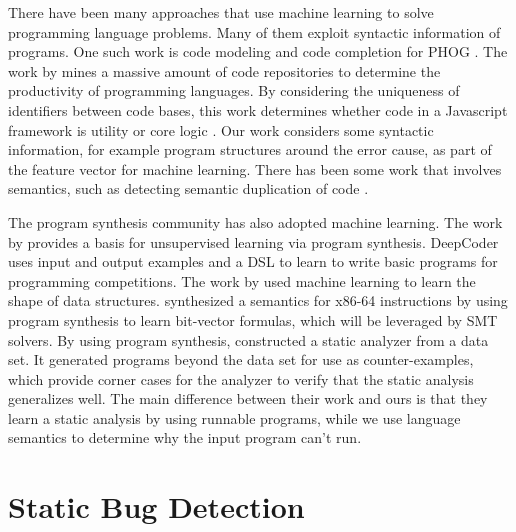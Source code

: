 \documentclass[12pt]{report}	%
\begin{document}
There have been many approaches that use machine learning to solve
programming language problems. Many of them exploit syntactic
information of programs. One such work is code modeling and code completion
for PHOG \cite{Bielik2016:PPM}.
The work by \cite{Allamanis:2013:MSC:2487085.2487127}
mines a massive amount of code
repositories to determine the productivity of programming languages.
By considering the
uniqueness of identifiers between code bases, this work
determines whether code in a Javascript framework is
utility or core logic \cite{Allamanis:2013:MSC:2487085.2487127}.
Our work considers some syntactic information, for example
program structures around the error cause, as part of the feature
vector for machine learning.
%
There has been
some work that involves semantics, such as detecting semantic
duplication of code \cite{Sheneamer:2016:SCD}.

The program synthesis community has also adopted machine learning.
The work by \cite{Ellis:2015:ULP:2969239.2969348} provides a basis for
unsupervised learning via program synthesis.
DeepCoder \cite{DBLP:journals/corr/BalogGBNT16} uses input and output
examples and a DSL to learn to write
basic programs for programming competitions.
The work by \cite{Zhu16:ALSS} used machine learning to learn
the shape of data structures. \cite{Heule:2016:SSA:2980983.2908121}
synthesized a semantics for x86-64 instructions by using program
synthesis to learn bit-vector formulas, which will be leveraged
by SMT solvers.
%
By using program synthesis, \cite{Bielik16:LSAD} constructed a static
analyzer from a data set.
It generated programs beyond the data set for use as counter-examples,
which provide corner cases for the analyzer to verify that the
static analysis generalizes well.
The main difference between their work
and ours is that they learn a static analysis by
using runnable programs, while we use language semantics
to determine why the input program can't run.

\section{Static Bug Detection}
\label{sec:review:bugdetector}
\end{document}
